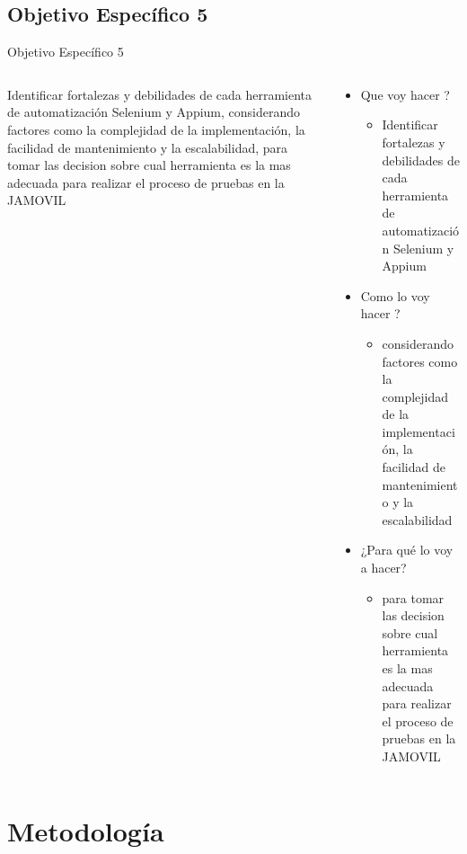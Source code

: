 \documentclass{beamer}
\begin{document}
\subsection{Objetivo Específico 5}
\begin{frame}{Objetivo Específico 5 }
  \begin{columns}
    \begin{column}{0.5\textwidth}
      Identificar fortalezas y debilidades de cada herramienta de automatización Selenium y Appium, considerando factores como la complejidad de la implementación, la facilidad de mantenimiento y la escalabilidad, para tomar las decision sobre cual herramienta es la mas adecuada para realizar el proceso de pruebas en la JAMOVIL 
 
    \end{column}
    \begin{column}{0.5\textwidth}
      \begin{itemize}
          \item Que voy hacer ?
          \begin{itemize}
              \item Identificar fortalezas y debilidades de cada herramienta de automatización Selenium y Appium
          \end{itemize}
          \item Como lo voy hacer ?
          \begin{itemize}
              \item considerando factores como la complejidad de la implementación, la facilidad de mantenimiento y la escalabilidad
          \end{itemize}
         \item ¿Para qué lo voy a hacer?
         \begin{itemize}
              \item para tomar las decision sobre cual herramienta es la mas adecuada para realizar el proceso de pruebas en la JAMOVIL
          \end{itemize}
      \end{itemize}
    \end{column}
  \end{columns}
\end{frame}



\section{Metodología}
\end{document}
